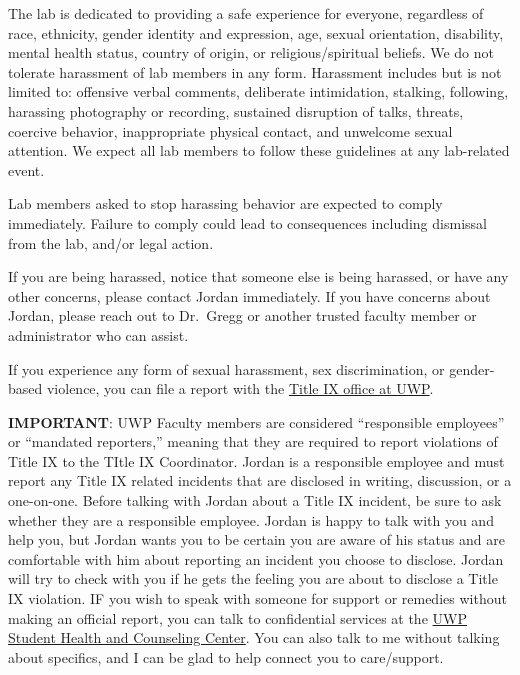 \documentclass[
]{book}
\begin{document}
The lab is dedicated to providing a safe experience for everyone, regardless of race, ethnicity, gender identity and expression, age, sexual orientation, disability, mental health status, country of origin, or religious/spiritual beliefs. We do not tolerate harassment of lab members in any form. Harassment includes but is not limited to: offensive verbal comments, deliberate intimidation, stalking, following, harassing photography or recording, sustained disruption of talks, threats, coercive behavior, inappropriate physical contact, and unwelcome sexual attention. We expect all lab members to follow these guidelines at any lab-related event.

Lab members asked to stop harassing behavior are expected to comply immediately. Failure to comply could lead to consequences including dismissal from the lab, and/or legal action.

If you are being harassed, notice that someone else is being harassed, or have any other concerns, please contact Jordan immediately. If you have concerns about Jordan, please reach out to Dr.~Gregg or another trusted faculty member or administrator who can assist.

If you experience any form of sexual harassment, sex discrimination, or gender-based violence, you can file a report with the \href{https://www.uwp.edu/explore/offices/titleix/}{Title IX office at UWP}.

\textbf{IMPORTANT}: UWP Faculty members are considered ``responsible employees'' or ``mandated reporters,'' meaning that they are required to report violations of Title IX to the TItle IX Coordinator. Jordan is a responsible employee and must report any Title IX related incidents that are disclosed in writing, discussion, or a one-on-one. Before talking with Jordan about a Title IX incident, be sure to ask whether they are a responsible employee. Jordan is happy to talk with you and help you, but Jordan wants you to be certain you are aware of his status and are comfortable with him about reporting an incident you choose to disclose. Jordan will try to check with you if he gets the feeling you are about to disclose a Title IX violation. IF you wish to speak with someone for support or remedies without making an official report, you can talk to confidential services at the \href{https://www.uwp.edu/live/services/studenthealth/}{UWP Student Health and Counseling Center}. You can also talk to me without talking about specifics, and I can be glad to help connect you to care/support.
\end{document}
